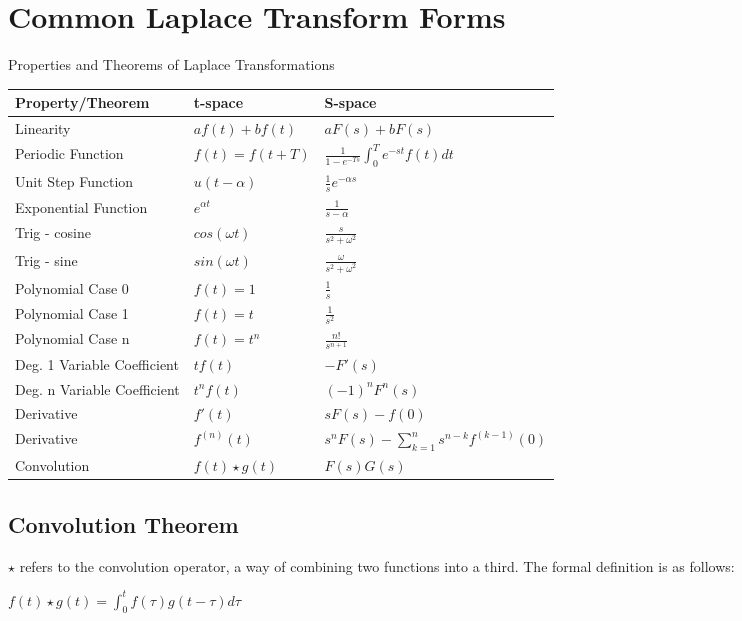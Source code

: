 \documentclass[12 pt, oneside]{book}
\begin{document}
\section{Common Laplace Transform Forms}
Properties and Theorems of Laplace Transformations\newline{}
\begin{tabular}{|p{.35\linewidth}|p{.25\linewidth}|p{.4\linewidth}|}
  \hline
  Property/Theorem & t-space & S-space \\
  \hline
  Linearity & $af(t)+bf(t)$ & $aF(s)+bF(s)$ \\
  \hline
  Periodic Function & $f(t)=f(t+T)$ & $\frac{1}{1-e^{-Ts}}\int^T_0e^{-st}f(t)dt$\\
  \hline
  Unit Step Function & $u(t-\alpha)$ & $\frac{1}{s}e^{-\alpha s}$\\
  \hline
  Exponential Function & $e^{\alpha t}$ & $\frac{1}{s-\alpha}$ \\
  \hline
  Trig - cosine & $cos(\omega t)$ & $\frac{s}{s^2+\omega^2}$\\
  \hline
  Trig - sine & $sin(\omega t)$ & $\frac{\omega}{s^2+\omega^2}$\\
  \hline
  Polynomial Case 0  & $f(t)=1$ & $\frac{1}{s}$ \\ 
  \hline
  Polynomial Case 1 & $f(t)=t$ & $\frac{1}{s^2}$ \\
  \hline
  Polynomial Case n & $f(t)=t^n$ & $\frac{n!}{s^{n+1}}$ \\
  \hline  
  Deg. 1 Variable Coefficient & $tf(t)$ & $-F'(s)$\\
  \hline
  Deg. n Variable Coefficient & $t^nf(t)$ & $(-1)^nF^{n}(s)$\\
  \hline
  Derivative & $f'(t)$ & $sF(s)-f(0)$\\
  \hline
  Derivative & $f^{(n)}(t)$ & $s^nF(s)-\sum^n_{k=1}s^{n-k}f^{(k-1)}(0)$ \\
  \hline
  Convolution & $f(t)\star g(t)$ & $F(s)G(s)$\\
  \hline
\end{tabular}

\subsection{Convolution Theorem}
$\star$ refers to the convolution operator, a way of combining two functions into a third. The formal definition is as follows:
\begin{mathline}
  $f(t)\star g(t) = \int^t_0f(\tau)g(t-\tau)d\tau$
\end{mathline}
\end{document}
